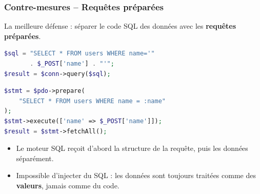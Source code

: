 \documentclass{beamer}
\begin{document}
\begin{frame}[fragile]
\frametitle{Contre-mesures -- Requêtes préparées}

La \alert{meilleure défense} : séparer le code SQL des données avec les \textbf{requêtes préparées}.

\begin{lstlisting}[language=PHP,title={\texttt{AVANT -- Vulnérable (concaténation)}}]
$sql = "SELECT * FROM users WHERE name='"
       . $_POST['name'] . "'";
$result = $conn->query($sql);
\end{lstlisting}

\begin{lstlisting}[language=PHP,title={\texttt{APRÈS -- Sécurisé (PDO prepared statement)}}]
$stmt = $pdo->prepare(
    "SELECT * FROM users WHERE name = :name"
);
$stmt->execute(['name' => $_POST['name']]);
$result = $stmt->fetchAll();
\end{lstlisting}

\begin{itemize}
\item Le moteur SQL reçoit d'abord la \alert{structure} de la requête, puis les \alert{données} séparément.
\item Impossible d'injecter du SQL : les données sont toujours traitées comme des \textbf{valeurs}, jamais comme du code.
\end{itemize}
\end{frame}
\end{document}
